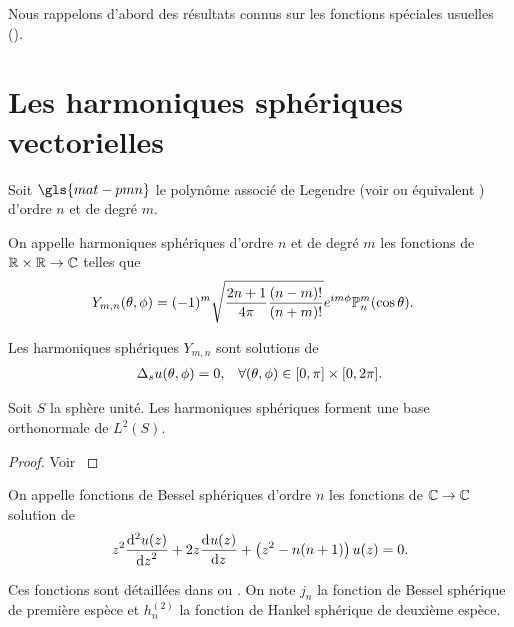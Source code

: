 Nous rappelons d'abord des résultats connus sur les fonctions spéciales usuelles (\cite{nedelec_acoustic_2001}).

\section{Les harmoniques sphériques vectorielles}

    \begin{defn}
        \label{def:sphere:harmoniques_spheriques}
        Soit \(\gls{mat-pmn}\) le polynôme associé de Legendre (voir \cite[Chapitre.~8]{abramowitz_handbook_1964} ou équivalent \cite[\url{https://dlmf.nist.gov/14.21\#i.p1}]{dlmf_nist_2019}) d'ordre \(n\) et de degré \(m\). 

        On appelle harmoniques sphériques d'ordre \(n\) et de degré \(m\) les fonctions de \(\RR\times\RR \rightarrow \CC\) telles que
        \begin{align*}
            Y_{m,n}(\tp) &= (-1)^m\sqrt{\frac{2n+1}{4\pi}\frac{(n-m)!}{(n+m)!}}e^{im\phi}\PP^m_n(\cos \theta).
        \end{align*}
    \end{defn}

    \begin{prop}
        Les harmoniques sphériques \(Y_{m,n}\) sont solutions de 
        \begin{align*}
            \lapls{} u(\tp) = 0, && \forall (\tp) \in [0,\pi]\times[0,2\pi].
        \end{align*}
    \end{prop}
    \begin{prop}
        Soit \(S\) la sphère unité. Les harmoniques sphériques forment une base orthonormale de \(L^2(S)\).
    \end{prop}
    \begin{proof}
        Voir \cite[p.~14]{nedelec_acoustic_2001}
    \end{proof}

    \begin{defn}
        \label{def:sphere:bessel_spheriques}
        On appelle fonctions de Bessel sphériques d'ordre \(n\) les fonctions de \(\CC \rightarrow \CC\) solution de
        \begin{align*}
            z^{2}\ddp[2]{z}{u(z)}+2z\ddp{z}{u(z)}+\left(z^{2}-n(n+1)\right)u(z)=0.
        \end{align*}
    \end{defn}
    Ces fonctions sont détaillées dans \cite[p.~437]{abramowitz_handbook_1964} ou \cite[\url{https://dlmf.nist.gov/10.47}]{dlmf_nist_2019}.
    On note \(j_n\) la fonction de Bessel sphérique de première espèce et \(h^{(2)}_n\) la fonction de Hankel sphérique de deuxième espèce.

